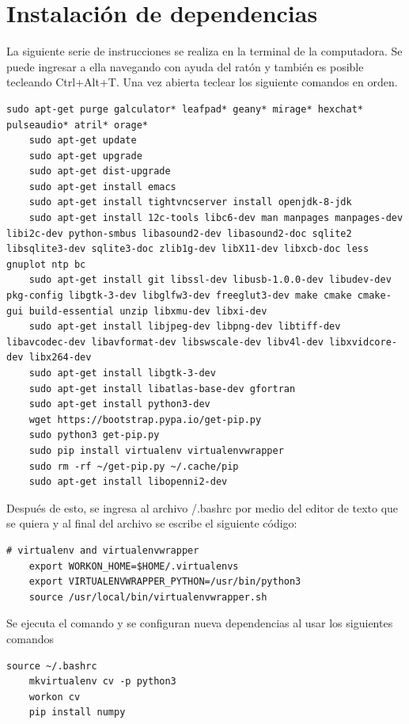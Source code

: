 \documentclass[12pt, letterpaper, oneside]{book}
\begin{document}
	\section{Instalación de dependencias}
	La siguiente serie de instrucciones se realiza en la terminal de la computadora. Se puede ingresar a ella navegando con ayuda del ratón y también es posible tecleando Ctrl+Alt+T. Una vez abierta teclear los siguiente comandos en orden.
	\lstset{language=bash}	
	\begin{lstlisting}[frame=single]
	sudo apt-get purge galculator* leafpad* geany* mirage* hexchat* pulseaudio* atril* orage* 
	sudo apt-get update
	sudo apt-get upgrade
	sudo apt-get dist-upgrade
	sudo apt-get install emacs
	sudo apt-get install tightvncserver install openjdk-8-jdk
	sudo apt-get install 12c-tools libc6-dev man manpages manpages-dev libi2c-dev python-smbus libasound2-dev libasound2-doc sqlite2 libsqlite3-dev sqlite3-doc zlib1g-dev libX11-dev libxcb-doc less gnuplot ntp bc
	sudo apt-get install git libssl-dev libusb-1.0.0-dev libudev-dev pkg-config libgtk-3-dev libglfw3-dev freeglut3-dev make cmake cmake-gui build-essential unzip libxmu-dev libxi-dev
	sudo apt-get install libjpeg-dev libpng-dev libtiff-dev libavcodec-dev libavformat-dev libswscale-dev libv4l-dev libxvidcore-dev libx264-dev
	sudo apt-get install libgtk-3-dev
	sudo apt-get install libatlas-base-dev gfortran
	sudo apt-get install python3-dev
	wget https://bootstrap.pypa.io/get-pip.py
	sudo python3 get-pip.py
	sudo pip install virtualenv virtualenvwrapper
	sudo rm -rf ~/get-pip.py ~/.cache/pip
	sudo apt-get install libopenni2-dev
	\end{lstlisting}
	Después de esto, se ingresa al archivo /.bashrc por medio del editor de texto que se quiera y al final del archivo se escribe el siguiente código:
	\begin{lstlisting}[frame=single]
	# virtualenv and virtualenvwrapper
	export WORKON_HOME=$HOME/.virtualenvs
	export VIRTUALENVWRAPPER_PYTHON=/usr/bin/python3
	source /usr/local/bin/virtualenvwrapper.sh
	\end{lstlisting}
	Se ejecuta el comando y se configuran nueva dependencias al usar los siguientes comandos
	\begin{lstlisting}[frame=single]
	source ~/.bashrc
	mkvirtualenv cv -p python3
	workon cv
	pip install numpy
	\end{lstlisting}
\end{document}
